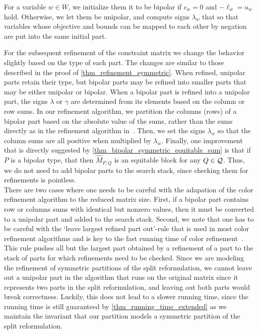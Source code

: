\documentclass[pdflatex,sn-mathphys-num]{sn-jnl}%
\theoremstyle{thmstyleone}%
\theoremstyle{thmstylethree}%
\theoremstyle{thmstyletwo}%
\begin{document}
For a variable $w\in W$, we initialize them it to be bipolar if $c_w = 0$ and $-\ell_w = u_w$ hold. Otherwise, we let them be unipolar, and compute signs $\lambda_w$ that so that variables whose objective and bounds can be mapped to each other by negation are put into the same initial part.

For the subsequent refinement of the constraint matrix we change the behavior slightly based on the type of each part. The changes are similar to those described in the proof of \cref{thm_refinement_symmetric}. When refined, unipolar parts retain their type, but bipolar parts may be refined into smaller parts that may be either unipolar or bipolar. When a bipolar part is refined into a unipolar part, the signs $\lambda$ or $\gamma$ are determined from its elements based on the column or row sums. In our refinement algorithm, we partition the columns (rows) of a bipolar part based on the absolute value of the sums, rather than the sums directly as in the refinement algorithm in~\cite{Grohe2014}. Then, we set the signs $\lambda_w$ so that the column sums are all positive when multiplied by $\lambda_w$. Finally, one improvement that is directly suggested by \cref{thm_bipolar_symmetric_equitable_sum} is that if $P$ is a bipolar type, that then $\widehat{M}_{P,Q}$ is an equitable block for any $Q\in \mathcal{Q}$. Thus, we do not need to add bipolar parts to the search stack, since checking them for refinements is pointless.\\

There are two cases where one needs to be careful with the adapation of the color refinement algorithm to the reduced matrix size. First, if a bipolar part contains row or columns sums with identical but nonzero values, then it must be converted to a unipolar part and added to the search stack. 
Second, we note that one has to be careful with the `leave largest refined part out'-rule that is used in most color refinement algorithms and is key to the fast running time of color refinement~\cite{Hopcroft1971}. This rule pushes all but the largest part obtained by a refinement of a part to the stack of parts for which refinements need to be checked.
Since we are modeling the refinement of symmetric partitions of the split reformulation, we cannot leave out a unipolar part in the algorithm that runs on the original matrix since it represents two parts in the split reformulation, and leaving out both parts would break correctness. Luckily, this does not lead to a slower running time, since the running time is still guaranteed by \cref{thm_running_time_extended} as we maintain the invariant that our partition models a symmetric partition of the split reformulation.
\end{document}
